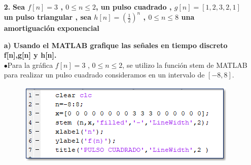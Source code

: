 \documentclass[11pt,a4paper]{article}
\begin{document}
{{\begin{enumerate}
Ahora usando \textbf{matlab} y el comando \textit{conv}  hallaremos las convoluciones de $f(t)*f(t),\ f(t)*g(t), \ g(t)*g(t),\ g(t)*h(t),\ h(t)*h(t)$
\newline \newline
\textbf{$f(t)*f(t)$}
\begin{figure}[H]
    \centering
    \texttt{[image: fig12.png]}
    \caption{convolucion de $h(t)*h(t)$ }
\end{figure}
\newpage
\textbf{$f(t)*g(t)$}
\begin{figure}[H]
    \centering
    \texttt{[image: fig13.png]}
    \caption{convolucion de $f(t)*h(t)$ }
\end{figure}
\newpage
\textbf{$g(t)*g(t)$}
\begin{figure}[H]
    \centering
    \texttt{[image: fig14.png]}
    \caption{convolucion de $g(t)*g(t)$ }
\end{figure} 
\newpage
\textbf{$g(t)*h(t)=h(t)*g(t)$}
\begin{figure}[H]
    \centering
    \texttt{[image: fig15.png]}
    \caption{convolucion de $g(t)*g(t)$ }
\end{figure} 
\newpage
\textbf{$h(t)*h(t)=h(t)*h(t)$}

\begin{figure}[H]
    \centering
    \texttt{[image: fig16.png]}
    \caption{convolucion de $h(t)*g(t)$ }
\end{figure}
	\newpage
	\item[\textbf{2.}]
	\textbf{Sea $f[n]=3$ , $0\leq n \leq 2$, un pulso cuadrado , $g[n]=[1,2,3,2,1]$ un pulso triangular , sea $h[n]=(\frac{1}{2})^n$ , $0\leq n\leq 8$ una amortiguación exponencial}
	\item[\textbf{a)}]
	\textbf{Usando el MATLAB grafique las señales en tiempo discreto f[n],g[n] y h[n].}\\
	$ \bullet$Para la gráfica $f[n]=3$ , $ 0\leq n\leq 2$, se utilizo la función stem de MATLAB para realizar un pulso cuadrado consideramos en un intervalo de $[-8,8]$.
\begin{figure}[h]
\centering
\includegraphics[scale=0.6]{../Imagenes de señales problema 2/Sin título.png} 
\end{figure}


\end{enumerate}}}
\end{document}
